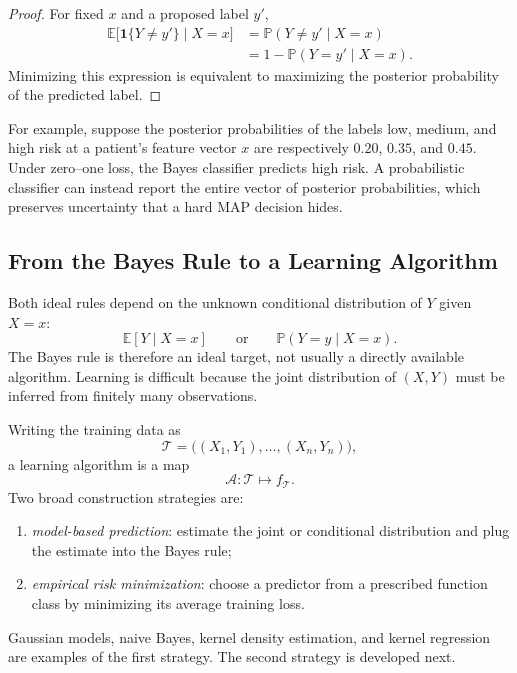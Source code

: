 \documentclass[12pt,oneside]{book}
\numberwithin{equation}{section}
\theoremstyle{definition}
\theoremstyle{plain}
\theoremstyle{remark}
\newcommand{\E}{\mathbb{E}}
\begin{document}
\begin{proof}
For fixed $x$ and a proposed label $y'$,
\begin{align*}
\E\bigl[\mathbf{1}\{Y\neq y'\}\mid X=x\bigr]
&=\mathbb{P}(Y\neq y'\mid X=x)\\
&=1-\mathbb{P}(Y=y'\mid X=x).
\end{align*}
Minimizing this expression is equivalent to maximizing the posterior
probability of the predicted label.
\end{proof}

For example, suppose the posterior probabilities of the labels low, medium,
and high risk at a patient's feature vector $x$ are respectively
$0.20$, $0.35$, and $0.45$. Under zero--one loss, the Bayes classifier predicts
high risk. A probabilistic classifier can instead report the entire vector of
posterior probabilities, which preserves uncertainty that a hard MAP decision
hides.

\subsection{From the Bayes Rule to a Learning Algorithm}
Both ideal rules depend on the unknown conditional distribution of $Y$ given
$X=x$:
\[
\E[Y\mid X=x]
\qquad\text{or}\qquad
\mathbb{P}(Y=y\mid X=x).
\]
The Bayes rule is therefore an ideal target, not usually a directly available
algorithm. Learning is difficult because the joint distribution of $(X,Y)$
must be inferred from finitely many observations.

Writing the training data as
\[
\mathcal{T}=\bigl((X_1,Y_1),\ldots,(X_n,Y_n)\bigr),
\]
a learning algorithm is a map
\[
\mathcal{A}\colon\mathcal{T}\longmapsto f_{\mathcal{T}}.
\]
Two broad construction strategies are:
\begin{enumerate}
    \item \emph{model-based prediction}: estimate the joint or conditional
    distribution and plug the estimate into the Bayes rule;
    \item \emph{empirical risk minimization}: choose a predictor from a
    prescribed function class by minimizing its average training loss.
\end{enumerate}
Gaussian models, naive Bayes, kernel density estimation, and kernel regression
are examples of the first strategy. The second strategy is developed next.
\end{document}
